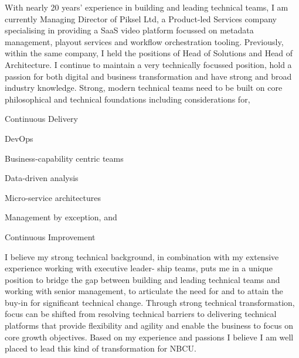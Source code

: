 \documentclass[11pt, a4paper]{awesome-cv} %
\begin{document}
\makecvheader %
\makelettertitle %
\begin{cvletter}
With nearly 20 years’ experience in building and leading technical teams, I am currently Managing Director of Piksel Ltd, a Product-led Services company specialising in providing a SaaS video platform focussed on metadata management, playout services and workflow orchestration tooling. Previously, within the same company, I held the positions of Head of Solutions and Head of Architecture. I continue to maintain a very technically focussed position, hold a passion for both digital and business transformation and have strong and broad industry knowledge.
Strong, modern technical teams need to be built on core philosophical and technical foundations including considerations for,
\vspace{3.4mm}
\begin{cvitems}
\item {Continuous Delivery}
\item {DevOps}
\item {Business-capability centric teams}
\item {Data-driven analysis}
\item {Micro-service architectures}
\item {Management by exception, and}
\item {Continuous Improvement}
\end{cvitems}
\vspace{3.4mm}
I believe my strong technical background, in combination with my extensive experience working with executive leader- ship teams, puts me in a unique position to bridge the gap between building and leading technical teams and working with senior management, to articulate the need for and to attain the buy-in for significant technical change.
Through strong technical transformation, focus can be shifted from resolving technical barriers to delivering technical platforms that provide flexibility and agility and enable the business to focus on core growth objectives.
Based on my experience and passions I believe I am well placed to lead this kind of transformation for NBCU.
\end{cvletter}
\makeletterclosing %
\end{document}
